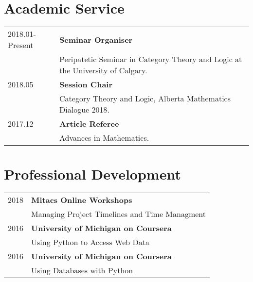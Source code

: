 \documentclass[10pt]{article}
\begin{document}
\section*{Academic Service}
\begin{tabu}{X[1]X[5]}
    2018.01-Present & \bf{Seminar Organiser}\\
{}& Peripatetic Seminar in Category Theory and Logic at the University of Calgary.\\

    2018.05 & \bf{Session Chair}\\
{}& Category Theory and Logic, Alberta Mathematics Dialogue 2018.\\

    2017.12 & \bf{Article Referee}\\
{}& Advances in Mathematics.\\

\end{tabu}

\section*{Professional Development}
\begin{tabu}{X[1]X[5]}
    2018 & \bf{Mitacs Online Workshops}\\
    &{}Managing Project Timelines and Time Managment\\ 

    2016 & \bf{University of Michigan on Coursera}\\
    &{}Using Python to Access Web Data\\ 

    2016 & \bf{University of Michigan on Coursera}\\
    &{}Using Databases with Python\\ 

\end{tabu}
\end{document}
